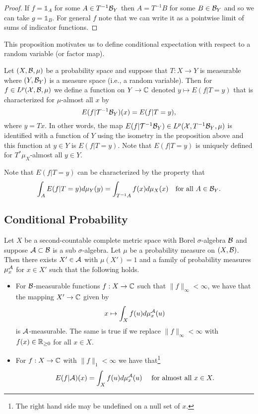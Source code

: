 \documentclass[twoside, a4paper, 10pt]{amsart}
\begin{document}
\begin{proof} If $f = \mathds{1}_A$ for some $A \in T^{-1}\mathcal{B}_Y$ then $A = T^{-1}B$ for some $B \in \mathcal{B}_Y$ and so we can take $g = \mathds{1}_B$. For general $f$ note that we can write it as a pointwise limit of sums of indicator functions. \end{proof}

This proposition motivates us to define conditional expectation with respect to a random variable (or factor map). 

\begin{mydef} Let $(X, \mathcal{B}, \mu)$ be a probability space and suppose that $T:X \to Y$ is measurable where $(Y, \mathcal{B}_Y)$ is a measure space (i.e., a random variable). Then for $f \in L^p(\mathcal{X},\mathcal{B},\mu)$ we define a function on $Y \to \mathbb{C}$ denoted $y \mapsto E(f| T=y)$ that is characterized for $\mu$-almost all $x$ by  $$E(f|\mathcal{T}^{-1}\mathcal{B}_Y)(x) = E(f| T=y),$$ where $y = Tx$. In other words, the map $E(f|\mathcal{T}^{-1}\mathcal{B}_Y) \in L^p(\mathcal{X},T^{-1}\mathcal{B}_Y,\mu)$ is identified with a function of $Y$ using the isometry in the proposition above and this function at $y \in Y$ is  $E(f| T=y)$. Note that $E(f|T=y)$ is uniquely defined for $T^*\mu_X$-almost all $y \in Y$.

\end{mydef}

Note that $E(f|T=y)$ can be characterized by the property that $$\int_A E(f|T=y) d\mu_Y(y) = \int_{T^{-1}A} f(x) d\mu_X(x) \quad \text{for all } A \in \mathcal{B}_Y.$$ 

\subsection{Conditional Probability}

\begin{thm} Let $X$ be a second-countable complete metric space with Borel $\sigma$-algebra $\mathcal{B}$ and suppose $\mathcal{A} \subset \mathcal{B}$ is a sub $\sigma$-algebra. Let $\mu$ be a probability measure on $(X,\mathcal{B})$. Then there exists $X' \in \mathcal{A}$ with $\mu(X')=1$ and a family of probability measures $\mu_x^{\mathcal{A}}$ for $x \in X'$ such that the following holds.

\begin{itemize}
	\item For $\mathcal{B}$-measurable functions $f:X \to \mathbb{C}$ such that $\|f\|_{\infty} < \infty$, we have that the mapping $X' \to \mathbb{C}$ given by $$x \mapsto \int_X f(u) d\mu_x^{\mathcal{A}} (u)$$ is $\mathcal{A}$-measurable. The same is true if we replace $\|f\|_{\infty} < \infty$ with $f(x) \in \mathbb{R}_{\geq 0}$ for all $x \in X$.
	\item For $f: X \to \mathbb{C}$ with $\|f\|_1 < \infty$ we have that\footnote{The right hand side may be undefined on a null set of $x$.}  $$E(f|\mathcal{A})(x) = \int_X f(u) d\mu_x^{\mathcal{A}} (u) \quad \text{ for almost all } x \in X.$$

\end{itemize}

\end{thm}
\end{document}
